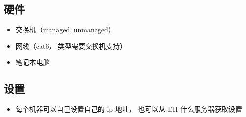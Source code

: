 
\begin{issues}
\issueDraft
\end{issues}

\subsection{硬件}
\begin{itemize}
\item 交换机（managed, unmanaged）
\item 网线（cat6， 类型需要交换机支持）
\item 笔记本电脑
\end{itemize}

\subsection{设置}
\begin{itemize}
\item 每个机器可以自己设置自己的 ip 地址， 也可以从 DH 什么服务器获取设置
\end{itemize}
